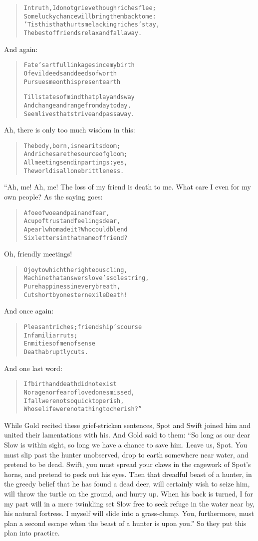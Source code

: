 \documentclass[article, twoside, 14pt]{memoir}
\renewenvironment{verbatim}{%
\begin{quote}%
\vskip -10pt%
\begin{alltt}\normalfont\large}{\end{alltt}%
\end{quote}%
\vskip -10pt
} %
\begin{document}
\begin{verbatim}
In truth, I do not grieve though riches flee;
Some lucky chance will bring them back to me:
'Tis this that hurts me{\textemdash}lacking riches' stay,
The best of friends relax and fall away.
\end{verbatim}
And again:

\begin{verbatim}
Fate's artful linkage since my birth
Of evil deeds and deeds of worth
Pursues me on this present earth

Till states of mind that play and sway
And change and range from day to day,
Seem lives that strive and pass away.
\end{verbatim}
Ah, there is only too much wisdom in this:

\begin{verbatim}
The body, born, is near its doom;
And riches are the source of gloom;
All meetings end in partings: yes,
The world is all one brittleness.
\end{verbatim}
“Ah, me! Ah, me! The loss of my friend is death to me. What care I
even for my own people? As the saying goes:

\begin{verbatim}
A foe of woe and pain and fear,
A cup of trust and feelings dear,
A pearl{\textemdash}who made it? Who could blend
Six letters in that name of friend?
\end{verbatim}
Oh, friendly meetings!

\begin{verbatim}
O joy to which the righteous cling,
Machine that answers love's sole string,
Pure happiness in every breath,
Cut short by one stern exile{\textemdash}Death!
\end{verbatim}
And once again:

\begin{verbatim}
Pleasant riches; friendship's course
    In familiar ruts;
Enmities of men of sense{\textemdash}
    Death abruptly cuts.
\end{verbatim}
And one last word:

\begin{verbatim}
If birth and death did not exist
Nor age nor fear of loved ones missed,
If all were not so quick to perish,
Whose life were not a thing to cherish?”
\end{verbatim}
While Gold recited these grief-stricken sentences, Spot and Swift
joined him and united their lamentations with his. And Gold said to
them:
``So long as our dear Slow is within sight, so long we have a chance to save him. Leave us, Spot. You must slip past the hunter unobserved, drop to earth somewhere near water, and pretend to be dead. Swift, you must spread your claws in the cagework of Spot's horns, and pretend to peck out his eyes. Then that dreadful beast of a hunter, in the greedy belief that he has found a dead deer, will certainly wish to seize him, will throw the turtle on the ground, and hurry up. When his back is turned, I for my part will in a mere twinkling set Slow free to seek refuge in the water near by, his natural fortress. I myself will slide into a grass-clump. You, furthermore, must plan a second escape when the beast of a hunter is upon you.''
So they put this plan into practice.
\end{document}
